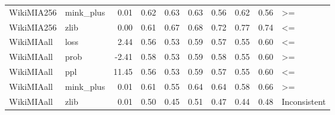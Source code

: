 \begin{tabular}{llrrrrrrrl}
WikiMIA256 & mink\_plus &           0.01 &           0.62 &     0.63 &      0.63 &          0.56 &    0.62 &     0.56 &                  >= \\
WikiMIA256 &      zlib &           0.00 &           0.61 &     0.67 &      0.68 &          0.72 &    0.77 &     0.74 &                  <= \\
WikiMIAall &      loss &           2.44 &           0.56 &     0.53 &      0.59 &          0.57 &    0.55 &     0.60 &                  <= \\
WikiMIAall &      prob &          -2.41 &           0.58 &     0.53 &      0.59 &          0.58 &    0.55 &     0.60 &                  >= \\
WikiMIAall &       ppl &          11.45 &           0.56 &     0.53 &      0.59 &          0.57 &    0.55 &     0.60 &                  <= \\
WikiMIAall & mink\_plus &           0.01 &           0.61 &     0.55 &      0.64 &          0.64 &    0.58 &     0.66 &                  >= \\
WikiMIAall &      zlib &           0.01 &           0.50 &     0.45 &      0.51 &          0.47 &    0.44 &     0.48 &        Inconsistent \\
\bottomrule
\end{tabular}
